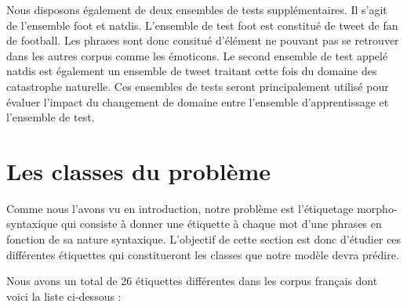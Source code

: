 \documentclass[french, 14pt]{memoir}
\begin{document}
Nous disposons également de deux ensembles de tests supplémentaires. Il s'agit de l'ensemble foot et natdis. L'ensemble de test foot est constitué de tweet de fan de football. Les phrases sont donc consitué d'élément ne pouvant pas se retrouver dans les autres corpus comme les émoticons. Le second ensemble de test appelé natdis est également un ensemble de tweet traitant cette fois du domaine des catastrophe naturelle. Ces ensembles de tests seront principalement utilisé pour évaluer l'impact du changement de domaine entre l'ensemble d'apprentissage et l'ensemble de test. 

\section{Les classes du problème}

Comme nous l'avons vu en introduction, notre problème est l'étiquetage morpho-syntaxique qui consiste à donner une étiquette à chaque mot d'une phrases en fonction de sa nature syntaxique. L'objectif de cette section est donc d'étudier ces différentes étiquettes qui constitueront les classes que notre modèle devra prédire.

Nous avons un total de 26 étiquettes différentes dans les corpus français dont voici la liste ci-dessous :
\end{document}
